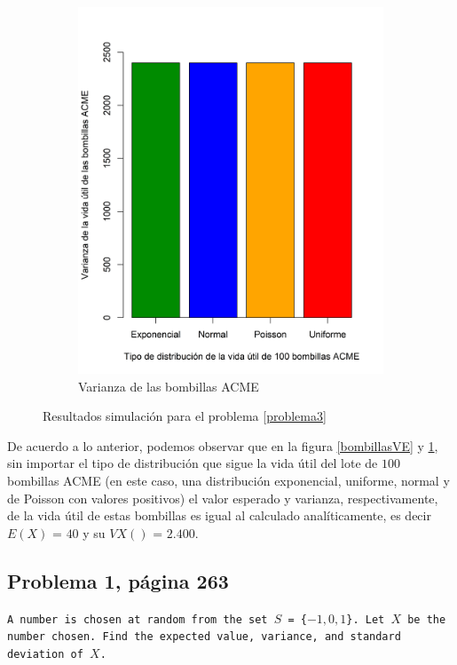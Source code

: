 \documentclass{article}
\begin{document}
\begin{figure}[h]
\begin{center}
\begin{subfigure}[b]{0.5\textwidth}
        \includegraphics[scale=0.5]{Figures/VarBombillas.png}
        \caption{Varianza de las bombillas ACME}
        \label{bombillasVar}
    \end{subfigure}
    \caption{Resultados simulación para el problema \ref{problema3}}
    \label{bombillas}
    \end{center}
\end{figure}

De acuerdo a lo anterior, podemos observar que en la figura \ref{bombillasVE} y \ref{bombillasVar}, sin importar el tipo de distribución que sigue la vida útil del lote de $100$ bombillas ACME (en este caso, una distribución exponencial, uniforme, normal y de Poisson con valores positivos) el valor esperado y varianza, respectivamente, de la vida útil de estas bombillas es igual al calculado analíticamente, es decir $E{(X)}$ = $40$ y su $V{X()}$ = $2.400$.

\subsection{Problema 1, página 263} \label{problema4}
\texttt{A number is chosen at random from the set $S$ = \{$-1, 0, 1$\}. Let $X$ be the number chosen. Find the expected value, variance, and standard deviation of $X$.}
\end{document}
